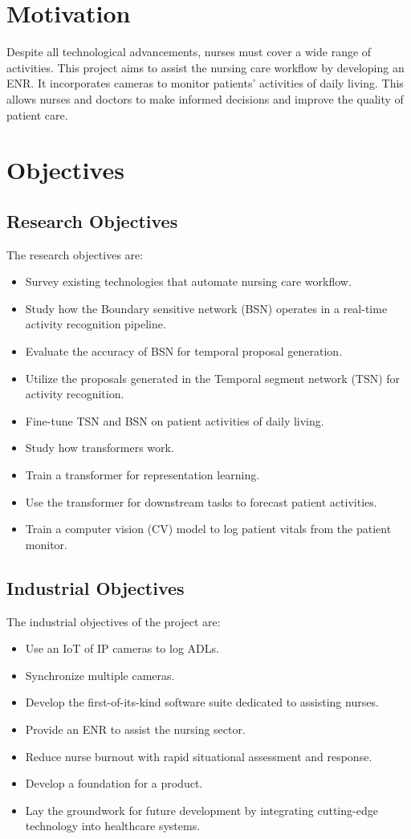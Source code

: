 \section{Motivation}
Despite all technological advancements, nurses must cover a wide range of activities.  This project aims to assist the nursing care workflow by developing an ENR. It incorporates cameras to monitor patients' activities of daily living. This allows nurses and doctors to make informed decisions and improve the quality of patient care.

\section{Objectives}

\subsection{Research Objectives}
The research objectives are:
\begin{itemize}
    \item Survey existing technologies that automate nursing care workflow.
    \item Study how the Boundary sensitive network (BSN) operates in a real-time activity recognition pipeline.
    \item Evaluate the accuracy of BSN for temporal proposal generation.
    \item Utilize the proposals generated in the Temporal segment network (TSN) for activity recognition.
    \item Fine-tune TSN and BSN on patient activities of daily living.
    \item Study how transformers work.
    \item Train a transformer for representation learning.
    \item Use the transformer for downstream tasks to forecast patient activities.
    \item Train a computer vision (CV) model to log patient vitals from the patient monitor.
\end{itemize}
\subsection{Industrial Objectives}
The industrial objectives of the project are:
\begin{itemize}
    \item Use an IoT of IP cameras to log ADLs.
    \item Synchronize multiple cameras.
    \item Develop the first-of-its-kind software suite dedicated to assisting nurses.
    \item Provide an ENR to assist the nursing sector.
    \item Reduce nurse burnout with rapid situational assessment and response.
    \item Develop a foundation for a product.
    \item Lay the groundwork for future development by integrating cutting-edge technology into healthcare systems.
\end{itemize}

